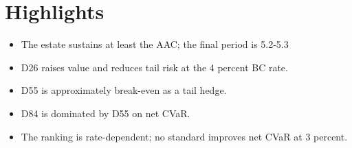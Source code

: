 \section*{Highlights}

\begin{itemize}
    \item The estate sustains at least the AAC; the final period is 5.2-5.3%
    \item D26 raises value and reduces tail risk at the 4 percent BC rate.
    \item D55 is approximately break-even as a tail hedge.
    \item D84 is dominated by D55 on net CVaR.
    \item The ranking is rate-dependent; no standard improves net CVaR at 3 percent.
\end{itemize}

\newpage
